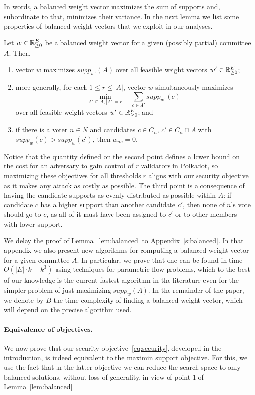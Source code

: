In words, a balanced weight vector maximizes the sum of supports and, subordinate to that, minimizes their variance. 
In the next lemma we list some properties of balanced weight vectors that we exploit in our analyses.

\begin{lemma}\label{lem:balanced}
Let $w\in\mathbb{R}_{\geq 0}^E$ be a balanced weight vector for a given (possibly partial) committee $A$. Then,
\begin{enumerate}
    \item vector $w$ maximizes $supp_{w'}(A)$ over all feasible weight vectors $w'\in\mathbb{R}_{\geq 0}^E$; 
    \item more generally, for each $1\leq r\leq |A|$, vector $w$ simultaneously maximizes 
    $$\min_{A'\subseteq A, |A'|=r} \quad \sum_{c\in A'} supp_{w'}(c)$$
over all feasible weight vectors $w'\in\mathbb{R}_{\geq 0}^E$; and
    \item if there is a voter $n\in N$ and candidates $c\in C_n$, $c'\in C_n\cap A$ with $supp_w(c)>supp_w(c')$, then $w_{nc}=0$.
\end{enumerate}
\end{lemma}

Notice that the quantity defined on the second point defines a lower bound on the cost for an adversary to gain control of $r$ validators in Polkadot, so maximizing these objectives for all thresholds $r$ aligns with our security objective as it makes any attack as costly as possible. 
The third point is a consequence of having the candidate supports as evenly distributed as possible within $A$: if candidate $c$ has a higher support than another candidate $c'$, then none of $n$'s vote should go to $c$, as all of it must have been assigned to $c'$ or to other members with lower support. 

We delay the proof of Lemma~\ref{lem:balanced} to Appendix~\ref{s:balanced}. 
In that appendix we also present new algorithms for computing a balanced weight vector for a given committee $A$. 
In particular, we prove that one can be found in time $O(|E|\cdot k + k^3)$ using techniques for parametric flow problems, which to the best of our knowledge is the current fastest algorithm in the literature even for the simpler problem of just maximizing $supp_w(A)$.
In the remainder of the paper, we denote by $B$ the time complexity of finding a balanced weight vector, which will depend on the precise algorithm used.

\paragraph{Equivalence of objectives.} 
We now prove that our security objective~\eqref{eq:security}, developed in the introduction, is indeed equivalent to the maximin support objective. For this, we use the fact that in the latter objective we can reduce the search space to only balanced solutions, without loss of generality, in view of point 1 of Lemma~\ref{lem:balanced}

